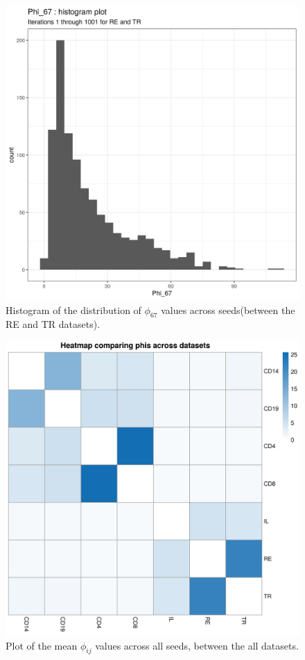 \documentclass[12pt]{article} %
\begin{document}
	\begin{figure}[h]
		\centering
		\includegraphics[scale=0.75]{Images/Biology_data/Set_250/All_datasets/Phi_histograms/Phi_67_histogram_plot.png}
		\caption{Histogram of the distribution of $\phi_{67}$ values across seeds(between the RE and TR datasets).}
		\label{fig:results:cedar_1:mdi_re_tr_phi_histogram}
	\end{figure}
	
	\newpage
	
	
	\begin{figure}[h]
		\centering
		\includegraphics[scale=0.75]{Images/Biology_data/Set_250/All_datasets/Phi_heatmap_1.png}
		\caption{Plot of the mean $\phi_{ij}$ values across all seeds, between the all datasets.}
		\label{fig:results:cedar_1:mdi_phi_heatmap}
	\end{figure}
	
\end{document}
